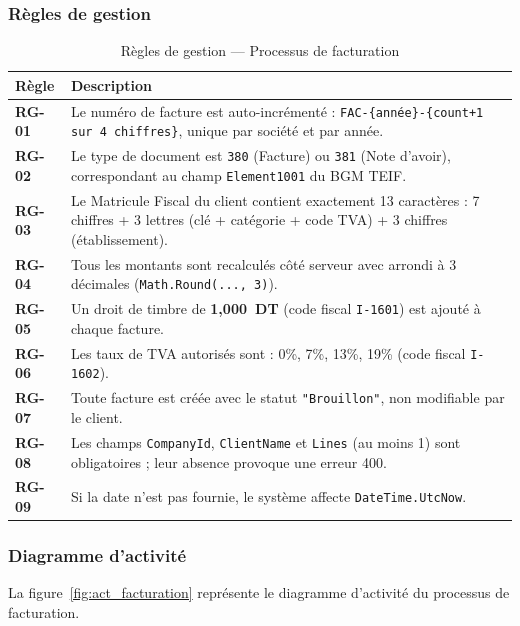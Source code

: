 \documentclass[a4paper,12pt]{report}
\begin{document}
\subsubsection*{Règles de gestion}

\begin{table}[htbp]
\centering
\caption{Règles de gestion — Processus de facturation}
\label{tab:rg_fact}
\begin{tabularx}{\textwidth}{|l|X|}
\hline
\textbf{Règle} & \textbf{Description} \\
\hline
\textbf{RG-01} & Le numéro de facture est auto-incrémenté : \texttt{FAC-\{année\}-\{count+1 sur 4 chiffres\}}, unique par société et par année. \\
\hline
\textbf{RG-02} & Le type de document est \texttt{380} (Facture) ou \texttt{381} (Note d'avoir), correspondant au champ \texttt{Element1001} du BGM TEIF. \\
\hline
\textbf{RG-03} & Le Matricule Fiscal du client contient exactement 13 caractères : 7 chiffres + 3 lettres (clé + catégorie + code TVA) + 3 chiffres (établissement). \\
\hline
\textbf{RG-04} & Tous les montants sont recalculés côté serveur avec arrondi à 3 décimales (\texttt{Math.Round(..., 3)}). \\
\hline
\textbf{RG-05} & Un droit de timbre de \textbf{1,000~DT} (code fiscal \texttt{I-1601}) est ajouté à chaque facture. \\
\hline
\textbf{RG-06} & Les taux de TVA autorisés sont : 0\%, 7\%, 13\%, 19\% (code fiscal \texttt{I-1602}). \\
\hline
\textbf{RG-07} & Toute facture est créée avec le statut \texttt{"Brouillon"}, non modifiable par le client. \\
\hline
\textbf{RG-08} & Les champs \texttt{CompanyId}, \texttt{ClientName} et \texttt{Lines} (au moins 1) sont obligatoires ; leur absence provoque une erreur 400. \\
\hline
\textbf{RG-09} & Si la date n'est pas fournie, le système affecte \texttt{DateTime.UtcNow}. \\
\hline
\end{tabularx}
\end{table}

\subsubsection*{Diagramme d'activité}

La figure~\ref{fig:act_facturation} représente le diagramme d'activité du processus de facturation.
\end{document}
